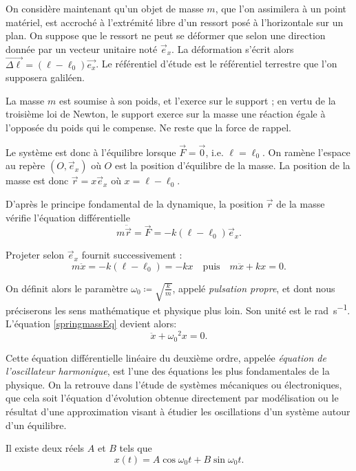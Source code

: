 \documentclass[../main]{subfiles}
\begin{document}
On considère maintenant qu'un objet de masse $m$, que l'on assimilera à un point matériel, est accroché à l'extrémité libre d'un ressort posé à l'horizontale sur un plan. On suppose que le ressort ne peut se déformer que selon une direction donnée par un vecteur unitaire noté $\vec{e}_x$. La déformation s'écrit alors $\vec{\Delta\ell}=(\ell-\ell_0)\vec{e_x}$. Le référentiel d'étude est le référentiel terrestre que l'on supposera galiléen. 

La masse $m$ est soumise à son poids, et l'exerce sur le support ; en vertu de la troisième loi de Newton, le support exerce sur la masse une réaction égale à l'opposée du poids qui le compense. Ne reste que la force de rappel.

Le système est donc à l'équilibre lorsque $\vec{F}=\vec{0}$, i.e. $\ell=\ell_0$. On ramène l'espace au repère $(O,\vec{e}_x)$ où $O$ est la position d'équilibre de la masse. La position de la masse est donc $\vec{r}=x\vec{e}_x$ où $x=\ell-\ell_0$.

D'après le principe fondamental de la dynamique, la position $\vec{r}$ de la masse vérifie l'équation différentielle
    \[
    m\ddot{\vec{r}} = \vec{F} = -k(\ell-\ell_0)\vec{e}_x.
    \]

Projeter selon $\vec{e}_x$ fournit successivement :
    \begin{equation}\label{springmassEq}
    m\ddot{x} = -k(\ell-\ell_0)=-kx
    \quad \text{puis}\quad m\ddot{x} + kx =0.
    \end{equation}

On définit alors le paramètre $\omega_0\coloneqq \sqrt{\frac{k}{m}}$, appelé \textit{pulsation propre}, et dont nous préciserons les sens mathématique et physique plus loin. Son unité est le \si{\radian\per\second}. L'équation \eqref{springmassEq} devient alors:
    \begin{equation}
        \ddot{x} + {\omega_0}^2x = 0.
    \end{equation}

Cette équation différentielle linéaire du deuxième ordre, appelée \textit{équation de l'oscillateur harmonique}, est l'une des équations les plus fondamentales de la physique. On la retrouve dans l'étude de systèmes mécaniques ou électroniques, que cela soit l'équation d'évolution obtenue directement par modélisation ou le résultat d'une approximation visant à étudier les oscillations d'un système autour d'un équilibre.

Il existe deux réels $A$ et $B$ tels que
	\begin{equation*}
	x(t) = A\cos\omega_0 t + B\sin\omega_0 t.
	\end{equation*}
\end{document}
